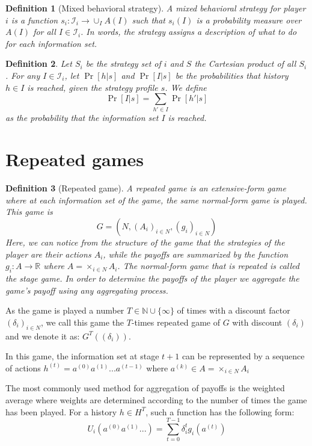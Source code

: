 \documentclass[12pt]{report}
\newtheorem{definition}{Definition}[chapter]
\newcommand{\Prob}[1]{\operatorname{Pr}\left[#1\right]}
\begin{document}

\begin{definition}[Mixed behavioral strategy]
A mixed behavioral strategy for player $i$ is a function $s_i:\mathcal{I}_i\to\cup_I A(I)$ such that $s_i(I)$ is a probability measure over $A(I)$ for all $I\in \mathcal{I}_i$. In words, the strategy assigns a description of what to do for each information set. 
\end{definition}

\begin{definition}
Let $S_i$ be the strategy set of $i$ and $S$ the Cartesian product of all $S_i$.  For any $I\in \mathcal{I}_i$, let $\Prob{h\vert s}$ and $\Prob{I\vert s}$ be the probabilities that history $h\in I$ is reached, given the strategy profile $s$. We define $$\Prob{I\vert s} = \sum_{h'\in I} \Prob{h'\vert s} $$ as the probability that the information set $I$ is reached.
\end{definition}

\section{Repeated games}

\begin{definition}[Repeated game]
A repeated game is an extensive-form game where at each information set of the game, the same normal-form game is played. This game is $$G = (N, (A_i)_{i\in N}, (g_i)_{i\in N}) $$ Here, we can notice from the structure of the game that the strategies of the player are their actions $A_i$, while the payoffs are summarized by the function $g_i:A\to\mathbb{R}$ where $A = \times_{i\in N} A_i$. The normal-form game that is repeated is called the stage game. In order to determine the payoffs of the player we aggregate the game's payoff using any aggregating process.
\end{definition}

As the game is played a number $T\in \mathbb{N}\cup \{\infty\} $ of times with a discount factor $(\delta_i)_{i\in N}$, we call this game the $T$-times repeated game of $G$ with discount $(\delta_i)$ and we denote it as: $G^T((\delta_i))$.

In this game, the information set at stage $t+1$ can be represented by a sequence of actions $h^{(t)} = a^{(0)}a^{(1)}...a^{(t-1)}$ where $a^{(k)}\in A = \times_{i\in N} A_i $

The most commonly used method for aggregation of payoffs is the weighted average where weights are determined according to the number of times the game has been played. For a history $h\in H^T$, such a function has the following form: $$U_i(a^{(0)}a^{(1)}...) = \sum_{t = 0}^{T-1} \delta_i^t g_i(a^{(t)}) $$
\end{document}
